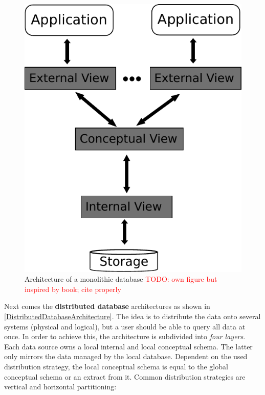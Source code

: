 \begin{figure}[H]
	\begin{center}
		\includegraphics[scale=0.5]{figures/monolithicalDatabaseArchitecture.pdf}
	\end{center}
	\caption{Architecture of a monolithic database \textcolor{red}{TODO: own figure but inspired by book; cite properly}}
	\label{MonolithicDatabaseArchitecture}
\end{figure}
Next comes the \textbf{distributed database} architectures as shown in \ref{DistributedDatabaseArchitecture}. The idea is to distribute the data onto several systems (physical and logical), but a user should be able to query all data at once. In order to achieve this, the architecture is subdivided into \textit{four layers}. Each data source owns a local internal and local conceptual schema. The latter only mirrors the data managed by the local database. Dependent on the used distribution strategy, the local conceptual schema is equal to the global conceptual schema  or an extract from it. Common distribution strategies are vertical and horizontal partitioning: 
